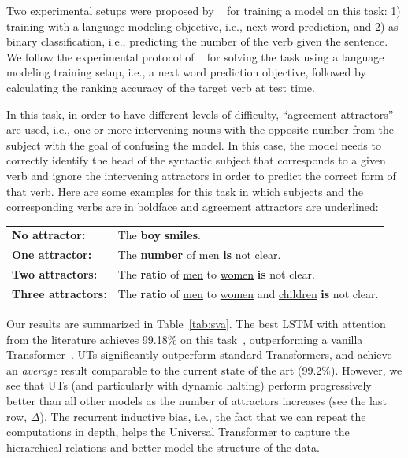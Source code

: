 Two experimental setups were proposed by ~\citet{linzen2016assessing} for training a model on this task: 1) training with a language modeling objective, i.e., next word prediction, and 2) as binary classification, i.e., predicting the number of the verb given the sentence. 
We follow the experimental protocol of ~\citet{linzen2016assessing} for solving the task using a language modeling training setup, i.e., a next word prediction objective, followed by calculating the ranking accuracy of the target verb at test time. 

In this task, in order to have different levels of difficulty, ``agreement attractors'' are used, i.e., one or more intervening nouns with the opposite number from the subject with the goal of confusing the model. In this case, the model needs to correctly identify the head of the syntactic subject that corresponds to a given verb and ignore the intervening attractors in order to predict the correct form of that verb.
Here are some examples for this task in which subjects and the corresponding verbs are in boldface and agreement attractors are underlined:
\begin{table}[h!]
\fontsize{9}{10}\selectfont
\begin{tabular}{l l}
\textbf{No attractor:} & The \textbf{boy} \textbf{smiles}. \\
\textbf{One attractor:}  &  The \textbf{number} of \underline{men} \textbf{is} not clear. \\
\textbf{Two attractors:}  &  The \textbf{ratio} of \underline{men} to \underline{women} \textbf{is} not clear. \\
\textbf{Three attractors:} &  The \textbf{ratio} of \underline{men} to \underline{women} and \underline{children} \textbf{is} not clear. 
\end{tabular}
\end{table}


Our results are summarized in Table~\ref{tab:sva}. The best LSTM with attention from the literature achieves 99.18\% on this task~\citep{yogatama2018memory}, outperforming a vanilla Transformer~\citep{tran18}. UTs significantly outperform standard Transformers, and achieve an \emph{average} result comparable to the current state of the art (99.2\%). However, we see that UTs (and particularly with dynamic halting) perform progressively better than all other models as the number of attractors increases (see the last row, $\Delta$).
The recurrent inductive bias, i.e., the fact that we can repeat the computations in depth, helps the Universal Transformer to capture the hierarchical relations and better model the structure of the data.

